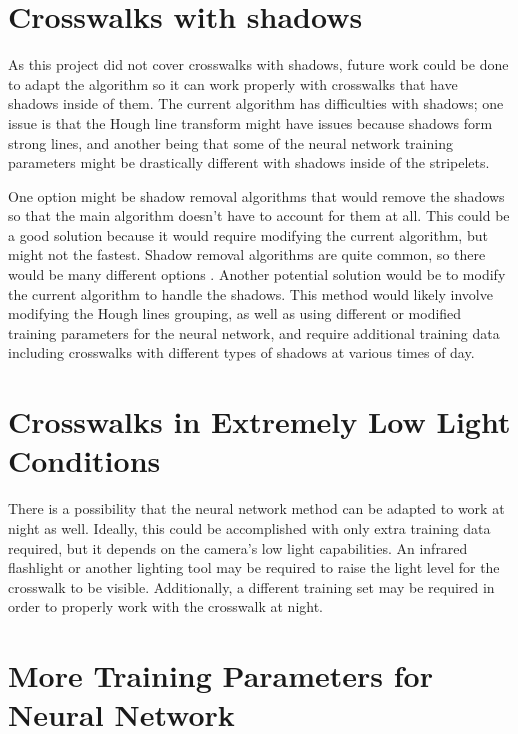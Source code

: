 \documentclass[12pt]{ucthesis}
\begin{document}
{\section{Crosswalks with shadows}

As this project did not cover crosswalks with shadows, future work could be done to adapt the algorithm so it can work properly with crosswalks that have shadows inside of them. The current algorithm has difficulties with shadows; one issue is that the Hough line transform might have issues because shadows form strong lines, and another being that some of the neural network training parameters might be drastically different with shadows inside of the stripelets. 

One option might be shadow removal algorithms that would remove the shadows so that the main algorithm doesn't have to account for them at all. This could be a good solution because it would require modifying the current algorithm, but might not the fastest. Shadow removal algorithms are quite common, so there would be many different options \cite{shadowRemoval}. Another potential solution would be to modify the current algorithm to handle the shadows. This method would likely involve modifying the Hough lines grouping, as well as using different or modified training parameters for the neural network, and require additional training data including crosswalks with different types of shadows at various times of day. 

\section{Crosswalks in Extremely Low Light Conditions}

There is a possibility that the neural network method can be adapted to work at night as well. Ideally, this could be accomplished with only extra training data required, but it depends on the camera's low light capabilities. An infrared flashlight or another lighting tool may be required to raise the light level for the crosswalk to be visible. Additionally, a different training set may be required in order to properly work with the crosswalk at night. 


\section{More Training Parameters for Neural Network}

}
\end{document}
